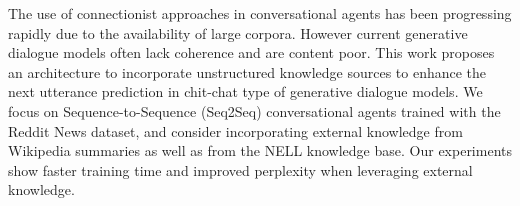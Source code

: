 The use of connectionist approaches in conversational agents has been progressing rapidly due to the availability of large corpora. However current generative dialogue models often lack coherence and are content poor.  This work proposes an architecture to incorporate unstructured knowledge sources to enhance the next utterance prediction in chit-chat type of generative dialogue models. We focus on Sequence-to-Sequence (Seq2Seq) conversational agents trained with the Reddit News dataset, and consider incorporating external knowledge from  Wikipedia summaries as well as from the NELL knowledge base. Our experiments show faster training time and improved perplexity when leveraging external knowledge.
